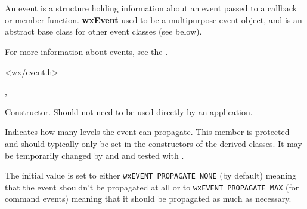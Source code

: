 \section{}\label{wxevent}

An event is a structure holding information about an event passed to a
callback or member function. {\bf wxEvent} used to be a multipurpose
event object, and is an abstract base class for other event classes (see below).

For more information about events, see the .





<wx/event.h>




,\rtfsp
{}



\label{wxeventctor}


Constructor. Should not need to be used directly by an application.


\label{wxeventmpropagationlevel}



Indicates how many levels the event can propagate. This member is protected and
should typically only be set in the constructors of the derived classes. It
may be temporarily changed by  
and  and tested with 
.

The initial value is set to either {\tt wxEVENT\_PROPAGATE\_NONE} (by
default) meaning that the event shouldn't be propagated at all or to 
{\tt wxEVENT\_PROPAGATE\_MAX} (for command events) meaning that it should be
propagated as much as necessary.

